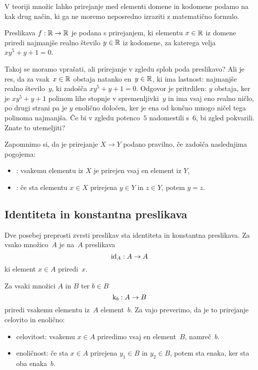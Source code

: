 V teoriji množic lahko prirejanje med elementi domene in kodomene podamo na kak drug način, ki ga ne moremo neposredno izraziti z matematično formulo.

\begin{zgled}
  \label{zgled:prirejanje-opis}
  Preslikava $f : \RR \to \RR$ je podana s prirejanjem, ki elementu $x \in \RR$ iz domene priredi najmanjše realno število $y \in \RR$ iz kodomene, za katerega velja $x y^5 + y + 1 = 0$.
\end{zgled}

Takoj se moramo vprašati, ali prirejanje v zgledu sploh poda preslikavo? Ali je res, da za vsak~$x \in \RR$ obstaja natanko en~$y \in \RR$, ki ima lastnost: najmanjše realno število~$y$, ki zadošča $x y^5 + y + 1 = 0$. Odgovor je pritrdilen: $y$ obstaja, ker je $x y^5 + y + 1$ polinom lihe stopnje v spremenljivki~$y$ in ima vsaj eno realno ničlo, po drugi strani pa je $y$ enolično določen, ker je ena od končno mnogo ničel tega polinoma najmanjša.
%
Če bi v zgledu potenco~$5$ nadomestili s~$6$, bi zgled pokvarili. Znate to utemeljiti?

Zapomnimo si, da je prirejanje $X \to Y$ podano pravilno, če zadošča naslednjima pogojema:
%
\begin{itemize}
\item {}: vsakemu elementu iz $X$ je prirejen vsaj en element iz $Y$,
\item {}: če sta elementu $x \in X$ prirejena $y \in Y$ in $z \in Y$, potem $y = z$.
\end{itemize}


\subsection{Identiteta in konstantna preslikava}
\label{sec:ident-konst-presl}

Dve posebej preprosti zvrsti preslikav sta identiteta in konstantna preslikava.
Za vsako množico~$A$ je  na~$A$ preslikava
%
\begin{equation*}
  \id[A] : A \to A
\end{equation*}
%
ki element $x \in A$ priredi~$x$.

Za vsaki množici $A$ in $B$ ter $b \in B$ 
%
\begin{equation*}
  \konst{b} : A \to B
\end{equation*}
%
priredi vsakemu elementu iz~$A$ element~$b$. Za vajo preverimo, da je to prirejanje celovito in enolično:
%
\begin{itemize}
\item celovitost: vsakemu $x \in A$ priredimo vsaj en element~$B$, namreč~$b$.
\item enoličnost: če sta $x \in A$ prirejena $y_1 \in B$ in $y_2 \in B$, potem sta enaka, ker sta oba enaka~$b$.
\end{itemize}

